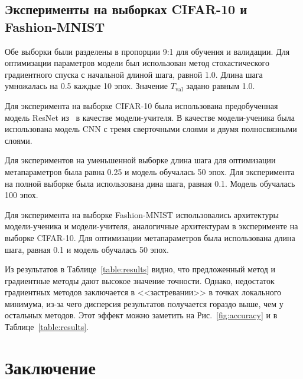 \documentclass[12pt]{a&t}
\begin{document}
\subsection{Эксперименты на выборках CIFAR-10 и Fashion-MNIST}

Обе выборки были разделены в пропорции 9:1 для обучения и валидации. Для оптимизации параметров модели был использован метод стохастического градиентного спуска с начальной длиной шага, равной 1.0. Длина шага умножалась на 0.5 каждые 10 эпох. Значение $T_\text{val}$ задано равным 1.0.

Для эксперимента на выборке CIFAR-10 была использована предобученная модель ResNet из~\cite{pkt_eccv} в качестве модели-учителя. В качестве модели-ученика была использована модель CNN с тремя сверточными слоями и двумя полносвязными слоями.

Для экспериментов на уменьшенной выборке длина шага для оптимизации метапараметров была равна 0.25 и модель обучалась 50 эпох. Для эксперимента на полной выборке была использована дина шага, равная 0.1. Модель обучалась 100 эпох. 

Для эксперимента на выборке Fashion-MNIST использовались архитектуры модели-ученика и модели-учителя, аналогичные архитектурам в эксперименте на выборке CIFAR-10. Для оптимизации метапараметров была использована длина шага, равная 0.1 и модель обучалась 50 эпох.

Из результатов в Таблице~\ref{table:results} видно, что предложенный метод и градиентные методы дают высокое значение точности. Однако, недостаток  градиентных методов заключается в <<застревании>> в точках локального минимума, из-за чего дисперсия результатов получается гораздо выше, чем у остальных методов. Этот эффект можно заметить на Рис.~\ref{fig:accuracy} и в Таблице~\ref{table:results}.


\section{Заключение}
\end{document}
